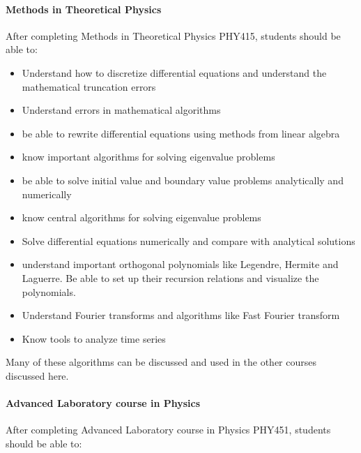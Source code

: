 \paragraph{Methods in Theoretical Physics}
After completing Methods in Theoretical Physics PHY415, students should be able to:
\begin{itemize}
\item Understand how to discretize differential equations and understand the mathematical truncation errors

\item Understand errors in mathematical algorithms

\item be able to rewrite differential equations using methods from linear algebra

\item know important algorithms for solving eigenvalue problems

\item be able to solve initial value and boundary value problems analytically and numerically

\item know central algorithms for solving eigenvalue problems

\item Solve differential equations numerically and compare with analytical solutions

\item understand  important orthogonal polynomials like Legendre, Hermite and Laguerre. Be able to set up their recursion relations and visualize the polynomials.

\item Understand Fourier transforms and algorithms like Fast Fourier transform

\item Know tools to analyze time series
\end{itemize}

\noindent
Many of these algorithms can be discussed and used in the other courses discussed here.

\paragraph{Advanced Laboratory course in Physics}
After completing Advanced Laboratory course in Physics PHY451, students should be able to:

